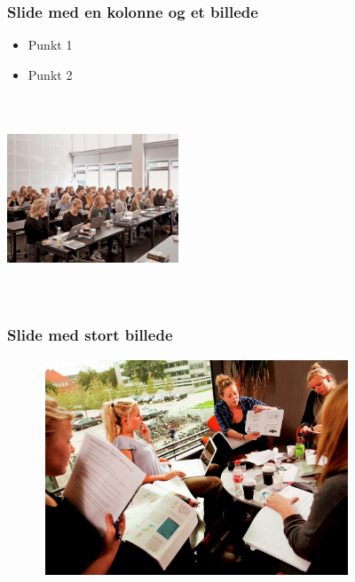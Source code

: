 \documentclass[t,24pt]{beamer}
\begin{document}
\begin{frame}[hvid]
    \frametitle{Slide med en kolonne og et billede}
    \begin{multicols}{2}
        \begin{itemize}
            \item Punkt 1
            \item Punkt 2
        \end{itemize}
        \vfill\null
        \columnbreak
        \includegraphics[width=5.1cm,height=6.1cm,keepaspectratio]{images/1.jpg}
    \end{multicols}
\end{frame}

\begin{frame}[hvid]
    \frametitle{Slide med stort billede}
    \vspace{0.5cm}
    \includegraphics[width=11.3cm,height=6.4cm,keepaspectratio]{images/2.jpg}
\end{frame}
\end{document}
